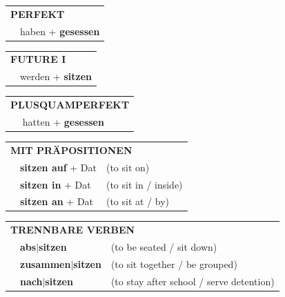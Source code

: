 \documentclass[10pt,a4paper]{revtex4-2}
\begin{document}
\begin{verbbox}
 \vspace{10pt}

 \begin{tabular}{rl}
     \multicolumn{2}{l}{\textbf{PERFEKT}}\\
   & haben + \textbf{gesessen}\\
  \end{tabular}
\hfill
\begin{tabular}{rl}
    \multicolumn{2}{l}{\textbf{FUTURE I}}\\
   & werden + \textbf{sitzen}\\
  \end{tabular}
\hfill
\begin{tabular}{rl}
    \multicolumn{2}{l}{\textbf{PLUSQUAMPERFEKT}}\\
   & hatten + \textbf{gesessen}\\
  \end{tabular}

 \vspace{10pt}

\begin{tabular}{lll}
      \multicolumn{3}{l}{\textbf{MIT PRÄPOSITIONEN}}\\
& \textbf{sitzen auf} + Dat & (to sit on)\\
& \textbf{sitzen in} + Dat & (to sit in / inside)\\
& \textbf{sitzen an} + Dat & (to sit at / by)\\
\end{tabular}
  \hfill
\begin{tabular}{lll}
      \multicolumn{3}{l}{\textbf{TRENNBARE VERBEN}}\\
 & \textbf{abs$|$sitzen} & (to be seated / sit down)\\
 & \textbf{zusammen$|$sitzen} & (to sit together / be grouped)\\
 & \textbf{nach$|$sitzen} & (to stay after school / serve detention)\\
  \end{tabular}
  \vspace{-5pt}

\end{verbbox}
\end{document}
